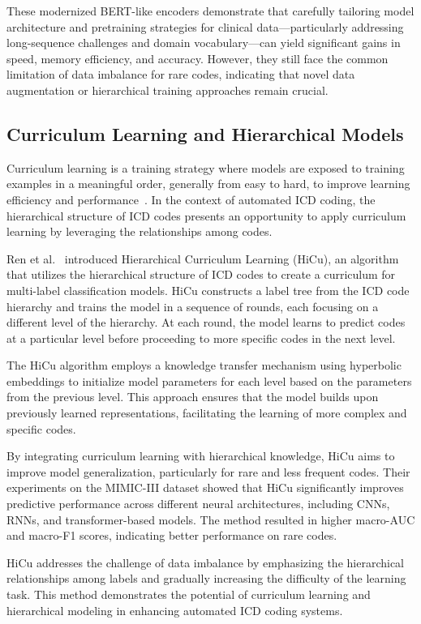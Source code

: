 \documentclass[12pt,a4paper]{report}
\begin{document}
These modernized BERT-like encoders demonstrate that carefully tailoring model architecture and pretraining strategies for clinical data---particularly addressing long-sequence challenges and domain vocabulary---can yield significant gains in speed, memory efficiency, and accuracy. However, they still face the common limitation of data imbalance for rare codes, indicating that novel data augmentation or hierarchical training approaches remain crucial.

\subsection{Curriculum Learning and Hierarchical Models}

Curriculum learning is a training strategy where models are exposed to training examples in a meaningful order, generally from easy to hard, to improve learning efficiency and performance~\cite{bengio2009curriculum}. In the context of automated ICD coding, the hierarchical structure of ICD codes presents an opportunity to apply curriculum learning by leveraging the relationships among codes.

Ren et al.~\cite{ren2022hicu} introduced Hierarchical Curriculum Learning (HiCu), an algorithm that utilizes the hierarchical structure of ICD codes to create a curriculum for multi-label classification models. HiCu constructs a label tree from the ICD code hierarchy and trains the model in a sequence of rounds, each focusing on a different level of the hierarchy. At each round, the model learns to predict codes at a particular level before proceeding to more specific codes in the next level.

The HiCu algorithm employs a knowledge transfer mechanism using hyperbolic embeddings to initialize model parameters for each level based on the parameters from the previous level. This approach ensures that the model builds upon previously learned representations, facilitating the learning of more complex and specific codes.

By integrating curriculum learning with hierarchical knowledge, HiCu aims to improve model generalization, particularly for rare and less frequent codes. Their experiments on the MIMIC-III dataset showed that HiCu significantly improves predictive performance across different neural architectures, including CNNs, RNNs, and transformer-based models. The method resulted in higher macro-AUC and macro-F1 scores, indicating better performance on rare codes.

HiCu addresses the challenge of data imbalance by emphasizing the hierarchical relationships among labels and gradually increasing the difficulty of the learning task. This method demonstrates the potential of curriculum learning and hierarchical modeling in enhancing automated ICD coding systems.
\end{document}
